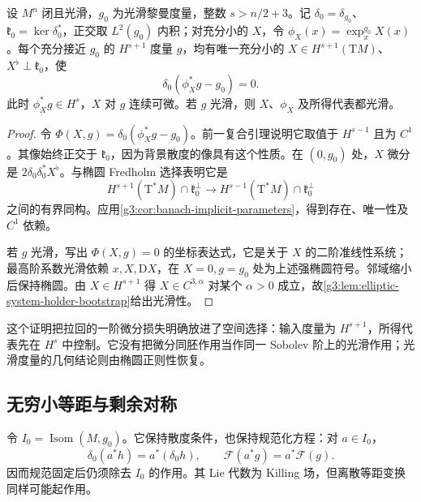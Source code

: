 \begin{theorem}\label{g3:thm:metric-divergence-slice}
	设 \(M^n\) 闭且光滑，\(g_0\) 为光滑黎曼度量，整数 \(s>n/2+3\)。记 \(\delta_0=\delta_{g_0}\)、\(\mathfrak k_0=\ker\delta_0^*\)，正交取 \(L^2(g_0)\) 内积；对充分小的 \(X\)，令 \(\phi_X(x)=\exp_x^{g_0}X(x)\)。每个充分接近 \(g_0\) 的 \(H^{s+1}\) 度量 \(g\)，均有唯一充分小的 \(X\in H^{s+1}(\mathrm TM)\)、\(X^\flat\perp\mathfrak k_0\)，使
	\[
		\delta_0(\phi_X^*g-g_0)=0.
	\]
	此时 \(\phi_X^*g\in H^s\)，\(X\) 对 \(g\) 连续可微。若 \(g\) 光滑，则 \(X\)、\(\phi_X\) 及所得代表都光滑。
\end{theorem}
\begin{proof}
	令 \(\Phi(X,g)=\delta_0(\phi_X^*g-g_0)\)。前一复合引理说明它取值于 \(H^{s-1}\) 且为 \(C^1\)。其像始终正交于 \(\mathfrak k_0\)，因为背景散度的像具有这个性质。在 \((0,g_0)\) 处，\(X\) 微分是 \(2\delta_0\delta_0^*X^\flat\)。与椭圆 Fredholm 选择表明它是
	\[
		H^{s+1}(\mathrm T^*M)\cap\mathfrak k_0^\perp
		\longrightarrow H^{s-1}(\mathrm T^*M)\cap\mathfrak k_0^\perp
	\]
	之间的有界同构。应用\cref{g3:cor:banach-implicit-parameters}，得到存在、唯一性及 \(C^1\) 依赖。

	若 \(g\) 光滑，写出 \(\Phi(X,g)=0\) 的坐标表达式，它是关于 \(X\) 的二阶准线性系统；最高阶系数光滑依赖 \(x,X,\mathrm DX\)，在 \(X=0,g=g_0\) 处为上述强椭圆符号。邻域缩小后保持椭圆。由 \(X\in H^{s+1}\) 得 \(X\in C^{3,\alpha}\) 对某个 \(\alpha>0\) 成立，故\cref{g3:lem:elliptic-system-holder-bootstrap}给出光滑性。
\end{proof}

这个证明把拉回的一阶微分损失明确放进了空间选择：输入度量为 \(H^{s+1}\)，所得代表先在 \(H^s\) 中控制。它没有把微分同胚作用当作同一 Sobolev 阶上的光滑作用；光滑度量的几何结论则由椭圆正则性恢复。

\subsection{无穷小等距与剩余对称}
\label{g3:subsec:2502:04}
令 \(I_0=\operatorname{Isom}(M,g_0)\)。它保持散度条件，也保持规范化方程：对 \(a\in I_0\)，
\[
	\delta_0(a^*h)=a^*(\delta_0h),\qquad
	\mathcal F(a^*g)=a^*\mathcal F(g).
\]
因而规范固定后仍须除去 \(I_0\) 的作用。其 Lie 代数为 Killing 场，但离散等距变换同样可能起作用。

